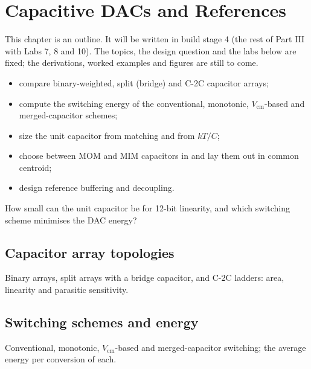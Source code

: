\chapter{Capacitive DACs and References}\label{ch:cdac}

\begin{specnote}
This chapter is an outline. It will be written in build stage 4 (the rest of Part III with Labs 7, 8 and 10). The topics, the design question and the labs below are fixed; the derivations, worked examples and figures are still to come.
\end{specnote}

\begin{objectives}
\begin{itemize}
  \item compare binary-weighted, split (bridge) and C-2C capacitor arrays;
  \item compute the switching energy of the conventional, monotonic, $V_\mathrm{cm}$-based and merged-capacitor schemes;
  \item size the unit capacitor from matching and from $kT/C$;
  \item choose between MOM and MIM capacitors in \sgx{} and lay them out in common centroid;
  \item design reference buffering and decoupling.
\end{itemize}
\end{objectives}

\begin{insight}
How small can the unit capacitor be for 12-bit linearity, and which switching scheme minimises the DAC energy?
\end{insight}

\section{Capacitor array topologies}\label{sec:ch17-1}
Binary arrays, split arrays with a bridge capacitor, and C-2C ladders: area, linearity and parasitic sensitivity.

\section{Switching schemes and energy}\label{sec:ch17-2}
Conventional, monotonic, $V_\mathrm{cm}$-based and merged-capacitor switching; the average energy per conversion of each.

